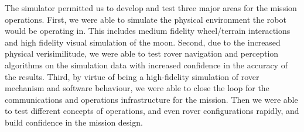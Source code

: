 \documentclass[twocolumn,letterpaper]{IEEEAerospaceCLS}  %
\begin{document}
The simulator permitted us to develop and test three major areas for the mission operations.  First, we were able to simulate the physical environment the robot would be operating in.  This includes medium fidelity wheel/terrain interactions and high fidelity visual simulation of the moon.  Second, due to the increased physical verisimilitude, we were able to test rover navigation and perception algorithms on the simulation data with increased confidence in the accuracy of the results.  Third, by virtue of being a high-fidelity simulation of rover mechanism and software behaviour, we were able to close the loop for the communications and operations infrastructure for the mission.  Then we were able to test different concepts of operations, and even rover configurations rapidly, and build confidence in the mission design.




\end{document}
